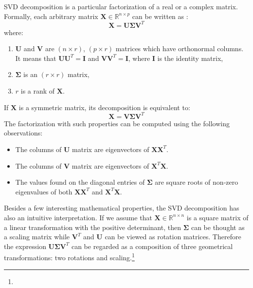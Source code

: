 \documentclass[english,a4paper,twoside]{ppfcmthesis}
\begin{document}
\begin{appendices}
SVD decomposition is a particular factorization of a real or a complex matrix. Formally, each arbitrary matrix $\boldsymbol{X} \in \mathbb{R}^{n \times p}$ can be written as \citep{Jolliffe}:
\begin{equation}
    \boldsymbol{X}=\boldsymbol{U}\boldsymbol{\Sigma}{\boldsymbol{V}^T}
\end{equation}
where:
\begin{enumerate}
    \item $\boldsymbol{U}$ and $\boldsymbol{V}$ are $(n \times r)$, $(p \times r)$ matrices which have orthonormal columns. It means that $\boldsymbol{U}\boldsymbol{U}^T=\boldsymbol{I}$ and $\boldsymbol{V}\boldsymbol{V}^T=\boldsymbol{I}$, where $\boldsymbol{I}$ is the identity matrix,
    \item $\boldsymbol{\Sigma}$ is an $(r \times r)$ matrix,
    \item $r$ is a rank of $\boldsymbol{X}$.
\end{enumerate}
If $\boldsymbol{X}$ is a symmetric matrix, its decomposition is equivalent to:
\begin{equation}
    \boldsymbol{X}=\boldsymbol{V}\boldsymbol{\Sigma}{\boldsymbol{V}^T}
\end{equation}
The factorization with such properties can be computed using the following observations:
\begin{itemize}
    \item The columns of $\boldsymbol{U}$ matrix are eigenvectors of $\boldsymbol{X}\boldsymbol{X}^T$.
    \item The columns of $\boldsymbol{V}$ matrix are eigenvectors of $\boldsymbol{X}^T\boldsymbol{X}$.
    \item The values found on the diagonal entries of $\boldsymbol{\Sigma}$ are square roots of non-zero eigenvalues of both $\boldsymbol{X}\boldsymbol{X}^T$ and $\boldsymbol{X}^T\boldsymbol{X}$.
\end{itemize}

Besides a few interesting mathematical properties, the SVD decomposition has also an intuitive interpretation. If we assume that $\boldsymbol{X} \in \mathbb{R}^{n \times n}$ is a square matrix of a linear transformation with the positive determinant, then $\boldsymbol{\Sigma}$ can be thought as a scaling matrix while $\boldsymbol{V}^T$ and $\boldsymbol{U}$ can be viewed as rotation matrices. Therefore the expression $\boldsymbol{U}\boldsymbol{\Sigma}{\boldsymbol{V}^T}$ can be regarded as a composition of three geometrical transformations: two rotations and scaling.\footnote{}


\end{appendices}
\end{document}
